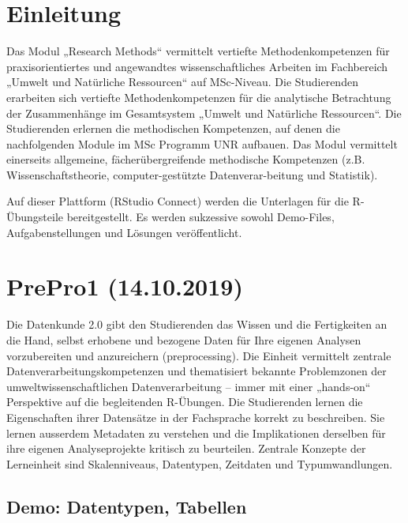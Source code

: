 \documentclass[]{book}
\begin{document}
{
\setcounter{tocdepth}{1}
\tableofcontents
}
\hypertarget{einleitung}{%
\chapter{Einleitung}\label{einleitung}}

Das Modul „Research Methods`` vermittelt vertiefte Methodenkompetenzen für praxisorientiertes und angewandtes wissenschaftliches Arbeiten im Fachbereich „Umwelt und Natürliche Ressourcen`` auf MSc-Niveau. Die Studierenden erarbeiten sich vertiefte Methodenkompetenzen für die analytische Betrachtung der Zusammenhänge im Gesamtsystem „Umwelt und Natürliche Ressourcen``. Die Studierenden erlernen die methodischen Kompetenzen, auf denen die nachfolgenden Module im MSc Programm UNR aufbauen. Das Modul vermittelt einerseits allgemeine, fächerübergreifende methodische Kompetenzen (z.B. Wissenschaftstheorie, computer-gestützte Datenverar-beitung und Statistik).

Auf dieser Plattform (RStudio Connect) werden die Unterlagen für die R-Übungsteile bereitgestellt. Es werden sukzessive sowohl Demo-Files, Aufgabenstellungen und Lösungen veröffentlicht.

\hypertarget{prepro1-14.10.2019}{%
\chapter{PrePro1 (14.10.2019)}\label{prepro1-14.10.2019}}

Die Datenkunde 2.0 gibt den Studierenden das Wissen und die Fertigkeiten an die Hand, selbst erhobene und bezogene Daten für Ihre eigenen Analysen vorzubereiten und anzureichern (preprocessing). Die Einheit vermittelt zentrale Datenverarbeitungskompetenzen und thematisiert bekannte Problemzonen der umweltwissenschaftlichen Datenverarbeitung -- immer mit einer „hands-on`` Perspektive auf die begleitenden R-Übungen. Die Studierenden lernen die Eigenschaften ihrer Datensätze in der Fachsprache korrekt zu beschreiben. Sie lernen ausserdem Metadaten zu verstehen und die Implikationen derselben für ihre eigenen Analyseprojekte kritisch zu beurteilen. Zentrale Konzepte der Lerneinheit sind Skalenniveaus, Datentypen, Zeitdaten und Typumwandlungen.

\hypertarget{demo-datentypen-tabellen}{%
\section{Demo: Datentypen, Tabellen}\label{demo-datentypen-tabellen}}
\end{document}
